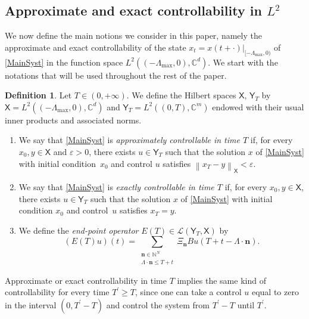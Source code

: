 \documentclass[10pt]{amsart}
\newcommand{\bn}{\boldsymbol{n}}
\theoremstyle{plain}
\theoremstyle{definition}
\newtheorem{defi}[theo]{Definition}
\newcommand{\norm}[1]{\left\lVert #1\right\lVert}
\begin{document}
\subsection{Approximate and exact controllability in \texorpdfstring{$L^2$}{L2}}
\label{SecControlL2}

We now define the main \hbox{notions} we consider in this paper, namely the approximate and exact controllability of the state $x_t = \left.x(t + \cdot)\right|_{[-\Lambda_{\max}, 0)}$ of \eqref{MainSyst} in the function space $L^2((-\Lambda_{\max}, 0), \mathbb C^d)$. We start with the notations that will be used throughout the rest of the paper.

\begin{defi}
\label{DefiContrExactApprox}
Let $T \in (0, +\infty)$. We define the Hilbert spaces $\mathsf X$, $\mathsf Y_T$ by $\mathsf X = L^2((-\Lambda_{\max}, 0), \mathbb C^d)$ and $\mathsf Y_T = L^2((0, T), \mathbb C^m)$ endowed with their usual inner products and associated norms.
\begin{enumerate}
\item We say that \eqref{MainSyst} is \emph{approximately controllable in time $T$} if, for every $x_0, y \in \mathsf X$ and $\varepsilon > 0$, there exists $u \in \mathsf Y_T$ such that the solution $x$ of \eqref{MainSyst} with initial condition~$x_0$ and control $u$ satisfies $\norm{x_T - y}_{\mathsf X} < \varepsilon$.

\item We say that \eqref{MainSyst} is \emph{exactly controllable in time $T$} if, for every $x_0, y \in \mathsf X$, there exists $u \in \mathsf Y_T$ such that the solution $x$ of \eqref{MainSyst} with initial condition $x_0$ and control~$u$ satisfies $x_T = y$.

\item We define the \emph{end-point operator} $E(T) \in \mathcal L(\mathsf Y_T, \mathsf X)$ by\vspace*{-3pt}
\begin{equation}
\label{EqDefET}
(E(T)u)(t) = \sum_{\substack{\bn \in \mathbb N^N \\ \Lambda \cdot \bn \leq T + t}} \Xi_{\bn} B u(T + t - \Lambda \cdot \bn).
\end{equation}
\end{enumerate}
\end{defi}

Approximate or exact controllability in time $T$ implies the same kind of controllability for every time $T^\prime \geq T$, since one can take a control $u$ equal to zero in the interval $(0, T^\prime - T)$ and control the system from $T^\prime - T$ until $T^\prime$.
\end{document}
